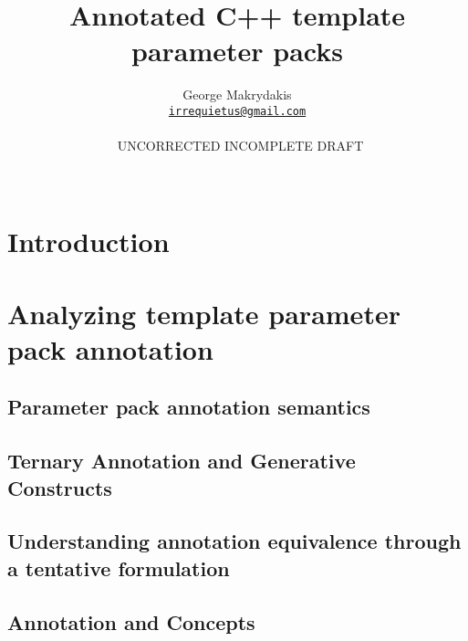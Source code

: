\documentclass[ notitlepage
              , a4paper
              , twoside ]{article}
\begin{document}

\title{Annotated C++ template parameter packs}
\author{George Makrydakis\\
\texttt{\href{mailto:irrequietus@gmail.com}{irrequietus@gmail.com}}\\\bf{{\
\color{magenta}UNCORRECTED INCOMPLETE DRAFT
\date{\bf{\GitCommitDate}}}}\\
\color{tone0}\texttt{\textbf{\GitLongRev}}}
\maketitle

\begin{abstract}
    
\end{abstract}



\newpage

\section{Introduction}
    

\section{Analyzing template parameter pack annotation}
    

    \subsection{Parameter pack annotation semantics}
        
        
    \subsection{Ternary Annotation and Generative Constructs}
        

    \subsection{Understanding annotation equivalence through a tentative formulation}
        
    
    \subsection{Annotation and Concepts}
        
\end{document}
